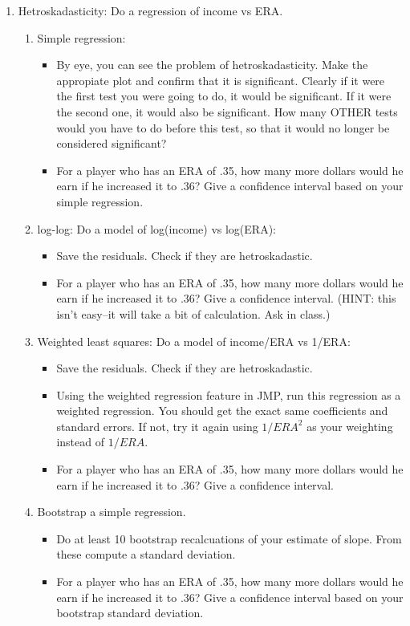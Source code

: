 \documentclass[11pt]{article}
\begin{document}
\begin{enumerate}
\item Hetroskadasticity: Do a regression of income vs ERA.
\begin{enumerate}
\item Simple regression:
\begin{itemize}
\item By eye, you can see the problem of hetroskadasticity.  Make the
appropiate plot and confirm that it is significant.  Clearly if it
were the first test you were going to do, it would be significant.  If
it were the second one, it would also be significant.  How many OTHER
tests would you have to do before this test, so that it would no
longer be considered significant?
\item For a player who has an ERA of .35, how many more dollars would
he earn if he increased it to .36?  Give a confidence interval based
on your simple regression.
\end{itemize}
\item log-log:  Do a model of log(income) vs log(ERA):
\begin{itemize}
\item  Save the residuals.  Check if they are hetroskadastic.
\item For a player who has an ERA of .35, how many more dollars would
he earn if he increased it to .36?  Give a confidence interval. (HINT:
this isn't easy--it will take a bit of calculation.  Ask in class.)
\end{itemize}
\item Weighted least squares:  Do a model of income/ERA vs 1/ERA:
\begin{itemize}
\item  Save the residuals.  Check if they are hetroskadastic.
\item Using the weighted regression feature in JMP, run this
regression as a weighted regression.  You should get the exact same
coefficients and standard errors.  If not, try it again using
$1/ERA^2$ as your weighting instead of $1/ERA$.
\item For a player who has an ERA of .35, how many more dollars would
he earn if he increased it to .36?  Give a confidence interval. 
\end{itemize}
\item Bootstrap a simple regression.
\begin{itemize}
\item Do at least 10 bootstrap recalcuations of your estimate of
slope.  From these compute a standard deviation.
\item For a player who has an ERA of .35, how many more dollars would
he earn if he increased it to .36?  Give a confidence interval based
on your bootstrap standard deviation.
\end{itemize}
\end{enumerate}
\end{enumerate}
\end{document}
